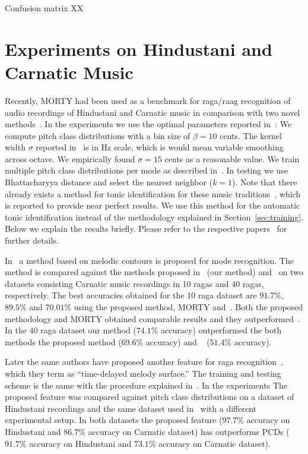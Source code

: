 \documentclass{sig-alternate}
\begin{document}
Confusion matrix XX

\section{Experiments on Hindustani and Carnatic Music}
\label{sec:hindustani_carnatic}

Recently, MORTY had been used as a benchmark for raga/raag recognition of audio recordings of Hindustani and Carnatic music in comparison with two novel methods~\cite{gulati_network, hindustani_carnatic_experiments_anon}. In the experiments we use the optimal parameters reported in~\cite{chordia}: We compute pitch class distributions with a bin size of $\beta=10$ cents. The kernel width $\sigma$ reported in~\cite{chordia} is in Hz scale, which is would mean variable smoothing across octave. We empirically found $\sigma = 15$ cents as a reasonable value. We train multiple pitch class distributions per mode as described in~\cite{chordia}. In testing we use Bhattacharyya distance and select the nearest neighbor ($k = 1$). Note that there already exists a method for tonic identification for these music traditions~\cite{sankalp_tonic}, which is reported to provide near perfect results. We use this method for the automatic tonic identification instead of the methodology explained in Section~\ref{sec:training}. Below we explain the results briefly. Please refer to the respective papers~\cite{gulati_network, hindustani_carnatic_experiments_anon} for further details.

In~\cite{gulati_network} a method based on melodic contours is proposed for mode recognition. The method is compared against the methods proposed in~\cite{chordia} (our method) and~\cite{koduri2014intonation} on two datasets consisting Carnatic music recordings in 10 ragas and 40 ragas, respectively. The best accuracies obtained for the 10 raga dataset are $91.7\%$, $89.5\%$ and $70.01\%$ using the proposed method, MORTY and~\cite{koduri2014intonation}. Both the proposed methodology and MORTY obtained comparable results and they outperformed~\cite{koduri2014intonation}. In the 40 raga dataset our method ($74.1\%$ accuracy) outperformed the both methods the proposed method ($69.6\%$ accuracy) and ~\cite{koduri2014intonation} ($51.4\%$ accuracy).

Later the same authors have proposed another feature for raga recognition~\cite{hindustani_carnatic_experiments_anon}, which they term as ``time-delayed melody surface.'' The training and testing scheme is the same with the procedure explained in~\cite{chordia}. In the experiments The proposed feature was compared against pitch class distributions on a dataset of Hindustani recordings and the same dataset used in~\cite{gulati_network} with a different experimental setup. In both datasets the proposed feature ($97.7\%$ accuracy on Hindustani and $86.7\%$ accuracy on Carnatic dataset) has outperforms PCDs ($91.7\%$ accuracy on Hindustani and $73.1\%$ accuracy on Carnatic dataset).
\end{document}
